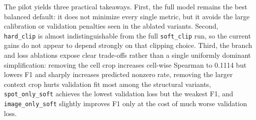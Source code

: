 \documentclass{article}
\begin{document}
\begin{table}[t]
\centering
\scriptsize
\setlength{\tabcolsep}{4pt}
\caption{STBoost pilot ablations on the A$\to$A protocol. All variants use $n_{\mathrm{train/ref}}=4096$ and $n_{\mathrm{test}}=2000$ under a matched pilot-scale evaluation budget, with identical preprocessing, split construction, target genes, and metrics.}
\label{tab:STBoost_k2k_ablation}
\end{table}

The pilot yields three practical takeaways. First, the full model remains the best balanced default: it does not minimize every single metric, but it avoids the large calibration or validation penalties seen in the ablated variants. Second, \texttt{hard\_clip} is almost indistinguishable from the full \texttt{soft\_clip} run, so the current gains do not appear to depend strongly on that clipping choice. Third, the branch and loss ablations expose clear trade-offs rather than a single uniformly dominant simplification: removing the cell crop increases cell-wise Spearman to 0.1114 but lowers F1 and sharply increases predicted nonzero rate, removing the larger context crop hurts validation fit most among the structural variants, \texttt{spot\_only\_soft} achieves the lowest validation loss but the weakest F1, and \texttt{image\_only\_soft} slightly improves F1 only at the cost of much worse validation loss.
\end{document}
